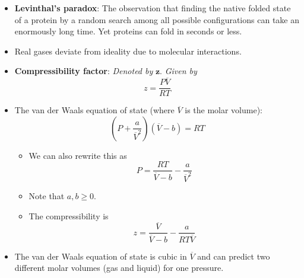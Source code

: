 \documentclass[../notes.tex]{subfiles}
\begin{document}
\begin{itemize}
\begin{itemize}
    \end{itemize}
    \item \textbf{Levinthal's paradox}: The observation that finding the native folded state of a protein by a random search among all possible configurations can take an enormously long time. Yet proteins can fold in seconds or less.
    \item Real gases deviate from ideality due to molecular interactions.
    \item \textbf{Compressibility factor}: \emph{Denoted by} $\bm{z}$. \emph{Given by}
    \begin{equation*}
        z = \frac{P\overline{V}}{RT}
    \end{equation*}
    \item The van der Waals equation of state (where $\overline{V}$ is the molar volume):
    \begin{equation*}
        \left( P+\frac{a}{\overline{V}^2} \right)(\overline{V}-b) = RT
    \end{equation*}
    \begin{itemize}
        \item We can also rewrite this as
        \begin{equation*}
            P = \frac{RT}{\overline{V}-b}-\frac{a}{\overline{V}^2}
        \end{equation*}
        \item Note that $a,b\geq 0$.
        \item The compressibility is
        \begin{equation*}
            z = \frac{\overline{V}}{\overline{V}-b}-\frac{a}{RT\overline{V}}
        \end{equation*}
    \end{itemize}
    \item The van der Waals equation of state is cubic in $\overline{V}$ and can predict two different molar volumes (gas and liquid) for one pressure.
    \begin{figure}[h!]
        \centering
\end{figure}
\end{itemize}
\end{document}
